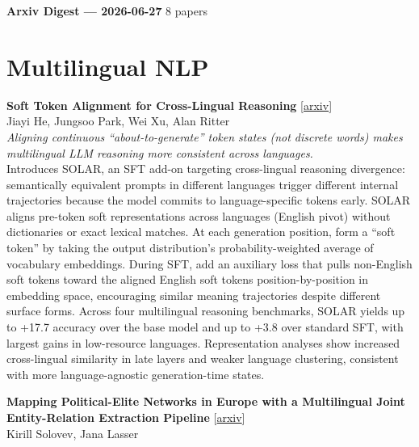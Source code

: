 \documentclass[12pt,letterpaper]{article}
\begin{document}
{\footnotesize\textbf{Arxiv Digest --- 2026-06-27} \hfill 8 papers}

\smallskip

\section*{Multilingual NLP}

{\small\textbf{Soft Token Alignment for Cross-Lingual Reasoning}} {\scriptsize[\href{https://arxiv.org/abs/2606.26466}{arxiv}]}\\
{\scriptsize Jiayi He, Jungsoo Park, Wei Xu, Alan Ritter}\\

{\small\textit{Aligning continuous ``about-to-generate'' token states (not discrete words) makes multilingual LLM reasoning more consistent across languages.}}\\[1pt]
{\footnotesize Introduces SOLAR, an SFT add-on targeting cross-lingual reasoning divergence: semantically equivalent prompts in different languages trigger different internal trajectories because the model commits to language-specific tokens early. SOLAR aligns pre-token soft representations across languages (English pivot) without dictionaries or exact lexical matches. At each generation position, form a ``soft token'' by taking the output distribution's probability-weighted average of vocabulary embeddings. During SFT, add an auxiliary loss that pulls non-English soft tokens toward the aligned English soft tokens position-by-position in embedding space, encouraging similar meaning trajectories despite different surface forms. Across four multilingual reasoning benchmarks, SOLAR yields up to +17.7 accuracy over the base model and up to +3.8 over standard SFT, with largest gains in low-resource languages. Representation analyses show increased cross-lingual similarity in late layers and weaker language clustering, consistent with more language-agnostic generation-time states.}

\medskip

{\small\textbf{Mapping Political-Elite Networks in Europe with a Multilingual Joint Entity-Relation Extraction Pipeline}} {\scriptsize[\href{https://arxiv.org/abs/2606.27347}{arxiv}]}\\
{\scriptsize Kirill Solovev, Jana Lasser}\\
\end{document}
